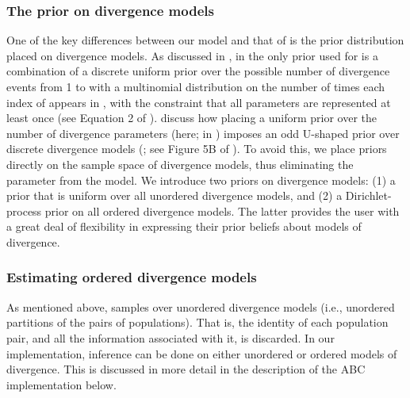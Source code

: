 \documentclass[letterpaper,12pt]{article}
\begin{document}
\begin{linenumbers}
\subsubsection*{The prior on divergence models}
One of the key differences between our model and that of \msb \citep{Huang2011}
is the prior distribution placed on divergence models.
As discussed in \citet{Oaks2012}, in \msb the only prior used for
\divTimeIndexVector is a combination of a discrete uniform prior over the
possible number of divergence events \divTimeNum from 1 to \npairs{} with a
multinomial distribution on the number of times each index of \divTimeVector
appears in \divTimeIndexVector, with the constraint that all \divTime
parameters are represented at least once (see Equation 2 of \citet{Oaks2012}).
\citet{Oaks2012} discuss how placing a uniform prior over the number of
divergence parameters (\divTimeNum here; \numt{} in \citet{Huang2011}) imposes
an odd U-shaped prior over discrete divergence models (\divTimeIndexVector; see
Figure 5B of \citet{Oaks2012}).
To avoid this, we place priors directly on the sample space of divergence
models, thus eliminating the parameter \numt{} from the model.
We introduce two priors on divergence models:
(1) a prior that is uniform over all unordered divergence models, and
(2) a Dirichlet-process prior on all ordered divergence models.
The latter provides the user with a great deal of flexibility in
expressing their prior beliefs about models of divergence.

\subsubsection*{Estimating ordered divergence models}
As mentioned above, \msb samples over unordered divergence models
(i.e., unordered partitions of the \npairs{} pairs of populations).
That is, the identity of each population pair, and all the information
associated with it, is discarded.
In our implementation, inference can be done on either unordered or ordered
models of divergence.
This is discussed in more detail in the description of the ABC implementation
below.


\end{linenumbers}
\end{document}
